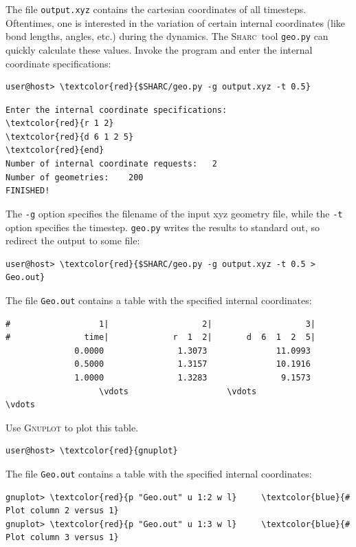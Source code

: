 \documentclass[a4paper,11pt,DIV=15,openany]{scrbook}
\newcommand{\sharc}{\textsc{Sharc}}
\newcommand{\ttt}[1]{\texttt{#1}}
\begin{document}
The file \ttt{output.xyz} contains the cartesian coordinates of all timesteps. Oftentimes, one is interested in the variation of certain internal coordinates (like bond lengths, angles, etc.) during the dynamics. The \sharc\ tool \ttt{geo.py} can quickly calculate these values. Invoke the program and enter the internal coordinate specifications:
\begin{Verbatim}[commandchars=\\\{\}]
user@host> \textcolor{red}{$SHARC/geo.py -g output.xyz -t 0.5}
\end{Verbatim}

\begin{oframed}
\footnotesize\begin{Verbatim}[commandchars=\\\{\}]
Enter the internal coordinate specifications:
\textcolor{red}{r 1 2}
\textcolor{red}{d 6 1 2 5}
\textcolor{red}{end}
Number of internal coordinate requests:   2
Number of geometries:    200
FINISHED!
\end{Verbatim}
\end{oframed}

\normalsize
The \ttt{-g} option specifies the filename of the input xyz geometry file, while the \ttt{-t} option specifies the timestep. \ttt{geo.py} writes the results to standard out, so redirect the output to some file:
\begin{Verbatim}[commandchars=\\\{\}]
user@host> \textcolor{red}{$SHARC/geo.py -g output.xyz -t 0.5 > Geo.out}
\end{Verbatim}
The file \ttt{Geo.out} contains a table with the specified internal coordinates:
\begin{oframed}
\footnotesize\begin{Verbatim}[commandchars=\\\{\}]
#                  1|                   2|                   3|
#               time|             r  1  2|       d  6  1  2  5|
              0.0000               1.3073              11.0993 
              0.5000               1.3157              10.1916 
              1.0000               1.3283               9.1573 
                   \vdots                    \vdots                    \vdots
\end{Verbatim}
\end{oframed}

Use \textsc{Gnuplot} to plot this table. 
\begin{Verbatim}[commandchars=\\\{\}]
user@host> \textcolor{red}{gnuplot}
\end{Verbatim}
The file \ttt{Geo.out} contains a table with the specified internal coordinates:
\begin{oframed}
\footnotesize\begin{Verbatim}[commandchars=\\\{\}]
gnuplot> \textcolor{red}{p "Geo.out" u 1:2 w l}     \textcolor{blue}{# Plot column 2 versus 1}
gnuplot> \textcolor{red}{p "Geo.out" u 1:3 w l}     \textcolor{blue}{# Plot column 3 versus 1}
\end{Verbatim}
\end{oframed}
\end{document}
